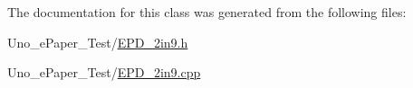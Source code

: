 The documentation for this class was generated from the following files\-:\begin{DoxyCompactItemize}
\item 
Uno\-\_\-e\-Paper\-\_\-\-Test/\hyperlink{EPD__2in9_8h}{E\-P\-D\-\_\-2in9.\-h}\item 
Uno\-\_\-e\-Paper\-\_\-\-Test/\hyperlink{EPD__2in9_8cpp}{E\-P\-D\-\_\-2in9.\-cpp}\end{DoxyCompactItemize}
